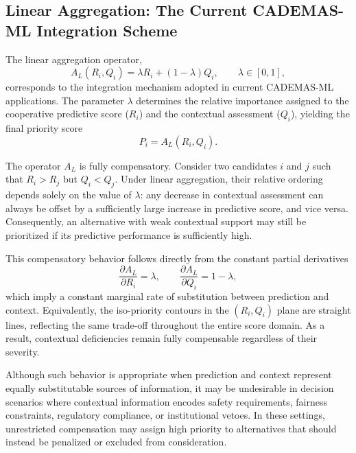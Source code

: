 \documentclass[mathematics,article,submit,moreauthors]{Definitions/mdpi}
\begin{document}
\subsection{Linear Aggregation: The Current CADEMAS-ML Integration Scheme}
\label{subsect:linear}

The linear aggregation operator,
\begin{equation}
A_L(R_i,Q_i)=\lambda R_i+(1-\lambda)Q_i,\qquad \lambda\in[0,1],
\end{equation}
corresponds to the integration mechanism adopted in current CADEMAS-ML applications. The parameter $\lambda$ determines the relative importance assigned to the cooperative predictive score ($R_i$) and the contextual assessment ($Q_i$), yielding the final priority score
\[
P_i=A_L(R_i,Q_i).
\]

The operator $A_L$ is fully compensatory. Consider two candidates $i$ and $j$ such that $R_i>R_j$ but $Q_i<Q_j$. Under linear aggregation, their relative ordering depends solely on the value of $\lambda$: any decrease in contextual assessment can always be offset by a sufficiently large increase in predictive score, and vice versa. Consequently, an alternative with weak contextual support may still be prioritized if its predictive performance is sufficiently high.

This compensatory behavior follows directly from the constant partial derivatives
\[
\frac{\partial A_L}{\partial R_i}=\lambda,\qquad
\frac{\partial A_L}{\partial Q_i}=1-\lambda,
\]
which imply a constant marginal rate of substitution between prediction and context. Equivalently, the iso-priority contours in the $(R_i,Q_i)$ plane are straight lines, reflecting the same trade-off throughout the entire score domain. As a result, contextual deficiencies remain fully compensable regardless of their severity.

Although such behavior is appropriate when prediction and context represent equally substitutable sources of information, it may be undesirable in decision scenarios where contextual information encodes safety requirements, fairness constraints, regulatory compliance, or institutional vetoes. In these settings, unrestricted compensation may assign high priority to alternatives that should instead be penalized or excluded from consideration.
\end{document}
